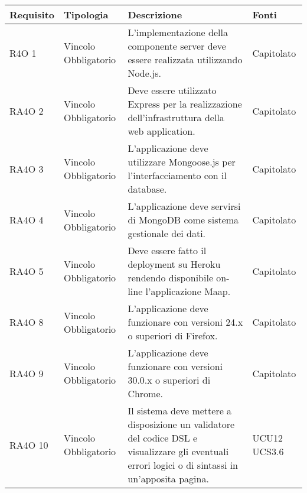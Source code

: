       \begin{center}
      \bgroup
      \def\arraystretch{1.8}
      \begin{longtable}{ | l | p{2cm} | p{5cm} | p{1.7cm} |}
    
      \cellcolor[gray]{0.9} \textbf{Requisito} & \cellcolor[gray]{0.9} \textbf{Tipologia} 
      & \cellcolor[gray]{0.9} \textbf{Descrizione} & \cellcolor[gray]{0.9} \textbf{Fonti} \\ \hline
      
        R4O 1 & Vincolo \newline  Obbligatorio  & L’implementazione della componente server deve essere realizzata utilizzando Node.js. &  Capitolato \newline  \\ \hline      
        RA4O 2 & Vincolo \newline  Obbligatorio  & Deve essere utilizzato Express per la realizzazione dell’infrastruttura della web application. &  Capitolato \newline  \\ \hline      
        RA4O 3 & Vincolo \newline  Obbligatorio  & L’applicazione deve utilizzare Mongoose.js per l’interfacciamento con il database. &  Capitolato \newline  \\ \hline      
        RA4O 4 & Vincolo \newline  Obbligatorio  & L’applicazione deve servirsi di  MongoDB come sistema gestionale dei dati. &  Capitolato \newline  \\ \hline      
        RA4O 5 & Vincolo \newline  Obbligatorio  & Deve essere fatto il deployment su Heroku rendendo disponibile on-line l’applicazione Maap. &  Capitolato \newline  \\ \hline      
        RA4O 8 & Vincolo \newline  Obbligatorio  & L’applicazione deve funzionare con versioni 24.x o superiori di Firefox. &  Capitolato \newline  \\ \hline      
        RA4O 9 & Vincolo \newline  Obbligatorio  & L’applicazione deve funzionare con versioni 30.0.x o superiori di Chrome. &  Capitolato \newline  \\ \hline      
        RA4O 10 & Vincolo \newline  Obbligatorio  & Il sistema deve mettere a disposizione un validatore del codice DSL e visualizzare gli eventuali errori logici o di sintassi in un'apposita pagina. &  UCU12 \newline  UCS3.6 \newline  \\ \hline
      \end{longtable}
      \egroup
      \end{center}  
\clearpage

